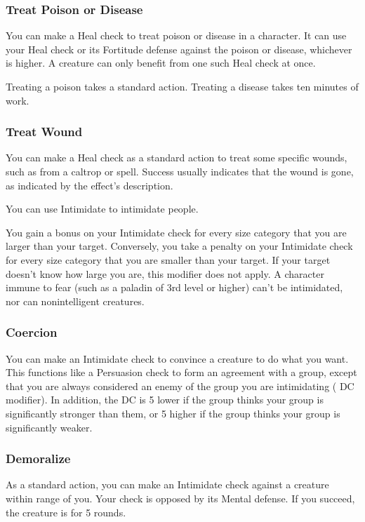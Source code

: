 \subsubsection{Treat Poison or Disease}
You can make a Heal check to treat poison or disease in a character. It can use your Heal check or its Fortitude defense against the poison or disease, whichever is higher. A creature can only benefit from one such Heal check at once.

Treating a poison takes a standard action. Treating a disease takes ten minutes of work.

\subsubsection{Treat Wound}
You can make a Heal check as a standard action to treat some specific wounds, such as from a caltrop or  spell. Success usually indicates that the wound is gone, as indicated by the effect's description.

You can use Intimidate to intimidate people.

You gain a  bonus on your Intimidate check for every size category that you are larger than your target. Conversely, you take a  penalty on your Intimidate check for every size category that you are smaller than your target. If your target doesn't know how large you are, this modifier does not apply. A character immune to fear (such as a paladin of 3rd level or higher) can't be intimidated, nor can nonintelligent creatures.

\subsubsection{Coercion}
You can make an Intimidate check to convince a creature to do what you want. This functions like a Persuasion check to form an agreement with a group, except that you are always considered an enemy of the group you are intimidating ( DC modifier). In addition, the DC is 5 lower if the group thinks your group is significantly stronger than them, or 5 higher if the group thinks your group is significantly weaker.

\subsubsection{Demoralize}\label{Demoralize}
As a standard action, you can make an Intimidate check against a creature within \rngmed range of you. Your check is opposed by its Mental defense. If you succeed, the creature is \shaken for 5 rounds.

